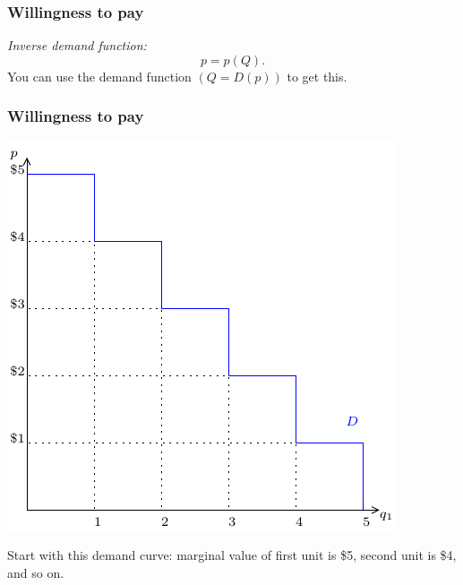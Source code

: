 \documentclass[xcolor=pdftex,dvipsnames]{beamer}
\begin{document}
\begin{frame}
\frametitle{Willingness to pay}
\emph{Inverse demand function:}
\[
p=p(Q).
\]
You can use the demand function $(Q=D(p))$ to get this.

\bigskip
{}

\bigskip
{}


\end{frame}




\begin{frame}
\frametitle{Willingness to pay}
\begin{center}
\includegraphics[scale=0.9]{pics/ConsumerWelfare1}
\end{center}
Start with this demand curve: marginal value of first unit is \$5,
second unit is \$4, and so on.
\end{frame}
\end{document}
